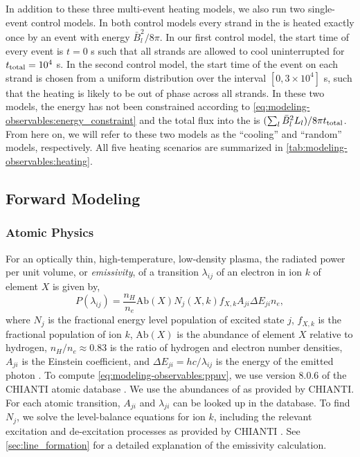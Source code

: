 In addition to these three multi-event heating models, we also run two single-event control models. In both control models every strand in the \AR{} is heated exactly once by an event with energy $\bar{B}_l^2/8\pi$. In our first control model, the start time of every event is $t=0$ s such that all strands are allowed to cool uninterrupted for $t_\textup{total}=10^4$ s. In the second control model, the start time of the event on each strand is chosen from a uniform distribution over the interval $[0, 3\times10^4]$ s, such that the heating is likely to be out of phase across all strands. In these two models, the energy has not been constrained according to \autoref{eq:modeling-observables:energy_constraint} and the total flux into the \AR{} is $(\sum_{l}\bar{B}_l^2L_l)/8\pi t_\textup{total}$. From here on, we will refer to these two models as the ``cooling'' and ``random'' models, respectively. All five heating scenarios are summarized in \autoref{tab:modeling-observables:heating}.

\subsection{Forward Modeling}\label{sec:modeling-observables:forward}

\subsubsection{Atomic Physics}\label{sec:modeling-observables:atomic}

For an optically thin, high-temperature, low-density plasma, the radiated power per unit volume, or \textit{emissivity}, of a transition $\lambda_{ij}$ of an electron in ion $k$ of element $X$ is given by,
\begin{equation}\label{eq:modeling-observables:ppuv}
    P(\lambda_{ij}) = \frac{n_H}{n_e}\mathrm{Ab}(X)N_j(X,k)f_{X,k}A_{ji}\Delta E_{ji}n_e,
\end{equation}
where $N_j$ is the fractional energy level population of excited state $j$, $f_{X,k}$ is the fractional population of ion $k$, $\mathrm{Ab}(X)$ is the abundance of element $X$ relative to hydrogen, $n_H/n_e\approx0.83$ is the ratio of hydrogen and electron number densities, $A_{ji}$ is the Einstein coefficient, and $\Delta E_{ji}=hc/\lambda_{ij}$ is the energy of the emitted photon \citep[see][]{mason_spectroscopic_1994,del_zanna_solar_2018}. To compute \autoref{eq:modeling-observables:ppuv}, we use version 8.0.6 of the CHIANTI atomic database \citep{dere_chianti_1997,young_chianti_2016}. We use the abundances of \citet{feldman_potential_1992} as provided by CHIANTI. For each atomic transition, $A_{ji}$ and $\lambda_{ji}$ can be looked up in the database. To find $N_j$, we solve the level-balance equations for ion $k$, including the relevant excitation and de-excitation processes as provided by CHIANTI \citep[see section 3.3 of][]{del_zanna_solar_2018}. See \autoref{sec:line_formation} for a detailed explanation of the emissivity calculation.

